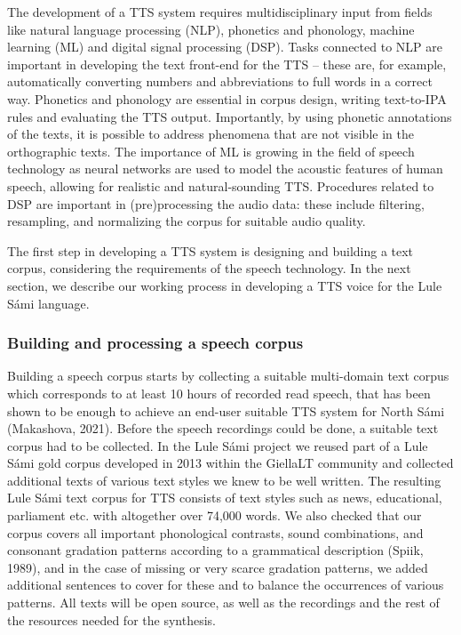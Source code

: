 \documentclass[free]{flammie}
\begin{document}
The development of a TTS system requires multidisciplinary input from fields like natural language processing (NLP), phonetics and phonology, machine learning (ML) and
digital signal processing (DSP). Tasks connected to NLP are important in developing the
text front-end for the TTS – these are, for example, automatically converting numbers and
abbreviations to full words in a correct way. Phonetics and phonology are essential in corpus design, writing text-to-IPA rules and evaluating the TTS output. Importantly, by using
phonetic annotations of the texts, it is possible to address phenomena that are not visible in
the orthographic texts. The importance of ML is growing in the field of speech technology
as neural networks are used to model the acoustic features of human speech, allowing for
realistic and natural-sounding TTS. Procedures related to DSP are important in (pre)processing the audio data: these include filtering, resampling, and normalizing the corpus for
suitable audio quality.

The first step in developing a TTS system is designing and building a text corpus, considering the requirements of the speech technology. In the next section, we describe our
working process in developing a TTS voice for the Lule Sámi language.

\subsubsection{Building and processing a speech corpus}

Building a speech corpus starts by collecting a suitable multi-domain text corpus which
corresponds to at least 10 hours of recorded read speech, that has been shown to be enough
to achieve an end-user suitable TTS system for North Sámi (Makashova, 2021). Before the
speech recordings could be done, a suitable text corpus had to be collected. In the Lule
Sámi project we reused part of a Lule Sámi gold corpus developed in 2013 within the GiellaLT community and collected additional texts of various text styles we knew to be well
written. The resulting Lule Sámi text corpus for TTS consists of text styles such as news,
educational, parliament etc. with altogether over 74,000 words. We also checked that our
corpus covers all important phonological contrasts, sound combinations, and consonant
gradation patterns according to a grammatical description (Spiik, 1989), and in the case of
missing or very scarce gradation patterns, we added additional sentences to cover for these
and to balance the occurrences of various patterns. All texts will be open source, as well as
the recordings and the rest of the resources needed for the synthesis.
\end{document}
